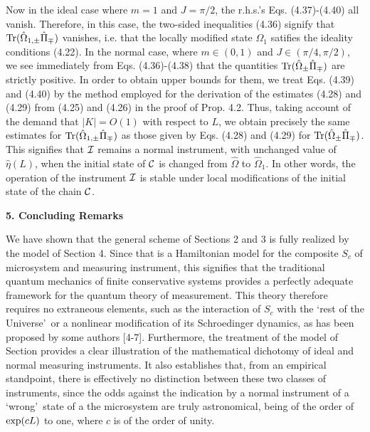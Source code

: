 \vskip 0.2cm
Now in the ideal case where $m=1$ and $J={\pi}/2$, the r.h.s.\rq s Eqs. (4.37)-(4.40) all 
vanish. Therefore, in this case,  the two-sided inequalities (4.36) signify that 
${\rm Tr}({\hat {\Omega}}_{1,{\pm}}{\hat {\Pi}}_{\mp})$ vanishes, i.e. that the 
locally modified state ${\Omega}_{1}$ satifies the ideality conditions (4.22).
\vskip 0.2cm
In the normal case, where $m{\in}(0,1)$ and $J{\in}({\pi}/4,{\pi}/2)$, we see 
immediately from Eqs. (4.36)-(4.38) that the quantities 
${\rm Tr}({\hat {\Omega}}_{\pm}{\hat {\Pi}}_{\mp})$ are strictly positive. In order to 
obtain upper bounds for them, we treat Eqs. (4.39) and (4.40) by the method employed 
for the derivation of the estimates (4.28) and (4.29) from (4.25) and (4.26) in the proof of 
Prop. 4.2. Thus, taking account of the demand that ${\vert}K{\vert}=O(1)$ with respect 
to $L$, we obtain precisely the same estimates for 
${\rm Tr}({\hat {\Omega}}_{1,{\pm}}{\hat {\Pi}}_{\mp})$ as  those given by Eqs. 
(4.28) and (4.29) for  ${\rm Tr}({\hat {\Omega}}_{\pm}{\hat {\Pi}}_{\mp})$. This 
signifies that ${\cal I}$ remains a normal instrument, with unchanged value of ${\hat 
{\eta}}(L)$, when the initial state of ${\cal C}$ is changed from ${\hat {\Omega}}$ to 
${\hat {\Omega}}_{1}$. In other words, the operation of the instrument ${\cal I}$ is 
stable under local modifications of the initial state of  the chain ${\cal C}$.
\vskip 0.5cm
\centerline {\bf  5. Concluding Remarks}
\vskip 0.3cm
We have shown that the general scheme of Sections 2 and 3 is fully realized by the model 
of Section 4. Since that is a Hamiltonian model for the composite $S_{c}$ of 
microsystem and measuring instrument, this signifies that the traditional quantum 
mechanics of finite conservative systems provides a perfectly adequate framework for the 
quantum theory of measurement. This  theory therefore requires no extraneous elements, 
such as the interaction of  $S_{c}$ with the \lq rest of the Universe\rq\  or a nonlinear 
modification of  its Schroedinger dynamics, as has been proposed by some authors [4-7]. 
Furthermore, the treatment of the model of Section  provides a clear illustration of the 
mathematical dichotomy of ideal and normal measuring instruments. It also establishes 
that, from an empirical standpoint, there is effectively no distinction between these two 
classes of instruments, since the odds against the indication by a normal instrument of a 
\lq wrong\rq\ state of  a the microsystem are truly astronomical, being of the order of 
${\rm exp}(cL)$ to one, where $c$ is of the order of unity. 
\vskip 0.2cm
